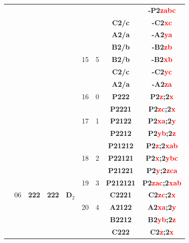 \documentclass{article}      %
\begin{document}
\begin{small}
\begin{longtable}[c]{|c|c|c|c|c|c|c|c|c|}
 & & & & & & & &\textbf{-P2\textcolor{red}{zabc}}  \\\cline{6-9}
 & & & & & & &\textbf{C2/c} &\textbf{-C2\textcolor{red}{xc}}  \\\cline{8-9}
 & & & & & & &\textbf{A2/a} &\textbf{-A2\textcolor{red}{ya}}  \\\cline{8-9}
 & & & & & & &\textbf{B2/b} &\textbf{-B2\textcolor{red}{zb}}  \\\cline{8-9}
 & & & & &\textrm{15} &5 &\textbf{B2/b} &\textbf{-B2\textcolor{red}{xb}}  \\\cline{8-9}
 & & & & & & &\textbf{C2/c} &\textbf{-C2\textcolor{red}{yc}}  \\\cline{8-9}
 & & & & & & &\textbf{A2/a} &\textbf{-A2\textcolor{red}{za}}  \\\hline
 & & & & &\textrm{16} &0 &\textbf{P222} &\textbf{P2\textcolor{red}{z};2\textcolor{red}{x}}  \\\cline{6-9}
 & & & & & & &\textbf{P2221} &\textbf{P2\textcolor{red}{zc};2\textcolor{red}{x}}  \\\cline{8-9}
 & & & & &\textrm{17} &1 &\textbf{P2122} &\textbf{P2\textcolor{red}{xa};2\textcolor{red}{y}}  \\\cline{8-9}
 & & & & & & &\textbf{P2212} &\textbf{P2\textcolor{red}{yb};2\textcolor{red}{z}}  \\\cline{6-9}
 & & & & & & &\textbf{P21212} &\textbf{P2\textcolor{red}{z};2\textcolor{red}{xab}}  \\\cline{8-9}
 & & & & &\textrm{18} &2 &\textbf{P22121} &\textbf{P2\textcolor{red}{x};2\textcolor{red}{ybc}}  \\\cline{8-9}
 & & & & & & &\textbf{P21221} &\textbf{P2\textcolor{red}{y};2\textcolor{red}{zca}}  \\\cline{6-9}
 & & & & &\textrm{19} &3 &\textbf{P212121} &\textbf{P2\textcolor{red}{zac};2\textcolor{red}{xab}}  \\\cline{6-9}
 & \textrm{06} & \textbf{222} & \textbf{222} & $\mathbf{D}_2$ & & &\textbf{C2221} &\textbf{C2\textcolor{red}{zc};2\textcolor{red}{x}}  \\\cline{8-9}
 & & & & &\textrm{20} &4 &\textbf{A2122} &\textbf{A2\textcolor{red}{xa};2\textcolor{red}{y}}  \\\cline{8-9}
 & & & & & & &\textbf{B2212} &\textbf{B2\textcolor{red}{yb};2\textcolor{red}{z}}  \\\cline{6-9}
 & & & & & & &\textbf{C222} &\textbf{C2\textcolor{red}{z};2\textcolor{red}{x}}  \\\cline{8-9}

\end{longtable}
\end{small}
\end{document}
